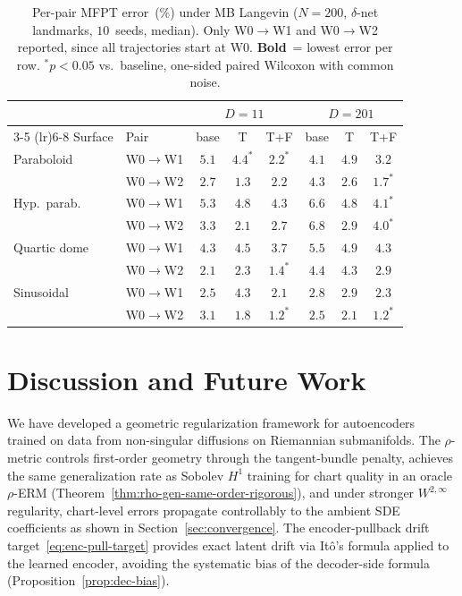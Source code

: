 \documentclass[11pt]{article}
\begin{document}
\begin{table}[ht]
\centering
\caption{Per-pair MFPT error~(\%) under MB Langevin
($N{=}200$, $\delta$-net landmarks, $10$~seeds, median).
Only W0${\to}$W1 and W0${\to}$W2 reported, since
all trajectories start at W0.
\textbf{Bold}~= lowest error per row.
${}^{*}p{<}0.05$ vs.\ baseline,
one-sided paired Wilcoxon with common noise.}
\label{tab:mb_mfpt}
\small
\begin{tabular}{ll ccc ccc}
\toprule
 & & \multicolumn{3}{c}{$D{=}11$} & \multicolumn{3}{c}{$D{=}201$} \\
\cmidrule(lr){3-5} \cmidrule(lr){6-8}
Surface & Pair & base & T & T+F & base & T & T+F \\
\midrule
Paraboloid & W0${\to}$W1
  & $5.1$ & $4.4^{*}$ & $\mathbf{2.2}^{*}$
  & $4.1$ & $4.9$ & $\mathbf{3.2}$ \\
 & W0${\to}$W2
  & $2.7$ & $\mathbf{1.3}$ & $2.2$
  & $4.3$ & $2.6$ & $\mathbf{1.7}^{*}$ \\
\midrule
Hyp.\ parab. & W0${\to}$W1
  & $5.3$ & $4.8$ & $\mathbf{4.3}$
  & ${6.6}$ & $4.8$ & $\mathbf{4.1}^*$ \\
 & W0${\to}$W2
  & $3.3$ & $\mathbf{2.1}$ & $2.7$
  & $6.8$ & $\mathbf{2.9}$ & $4.0^{*}$ \\  %
\midrule
Quartic dome & W0${\to}$W1
  & ${4.3}$ & $4.5$ & $\mathbf{3.7}$
  & ${5.5}$ & $4.9$ & $\mathbf{4.3}$ \\
 & W0${\to}$W2
  & $2.1$ & $2.3$ & $\mathbf{1.4}^*$
  & ${4.4}$ & $4.3$ & $\mathbf{2.9}$ \\
\midrule
Sinusoidal & W0${\to}$W1
  & $2.5$ & $4.3$ & $\mathbf{2.1}$
  & $2.8$ & $2.9$ & $\mathbf{2.3}$ \\
 & W0${\to}$W2
  & $3.1$ & $1.8$ & $\mathbf{1.2}^*$
  & $2.5$ & $2.1$ & $\mathbf{1.2}^*$ \\
\bottomrule
\end{tabular}
\end{table}

\section{Discussion and Future Work}\label{sec:discussion}

We have developed a geometric regularization framework for autoencoders trained on
data from non-singular diffusions on Riemannian submanifolds.
The $\rho$-metric controls first-order geometry through the tangent-bundle penalty,
achieves the same generalization rate as Sobolev $H^1$ training
for chart quality in an oracle $\rho$-ERM
(Theorem~\ref{thm:rho-gen-same-order-rigorous}),
and under stronger $W^{2,\infty}$ regularity, chart-level errors
propagate controllably to the ambient SDE coefficients
as shown in Section~\ref{sec:convergence}.
The encoder-pullback drift target~\eqref{eq:enc-pull-target}
provides exact latent drift via It\^o's formula applied to the
learned encoder, avoiding the systematic bias of the decoder-side
formula (Proposition~\ref{prop:dec-bias}).
\end{document}
